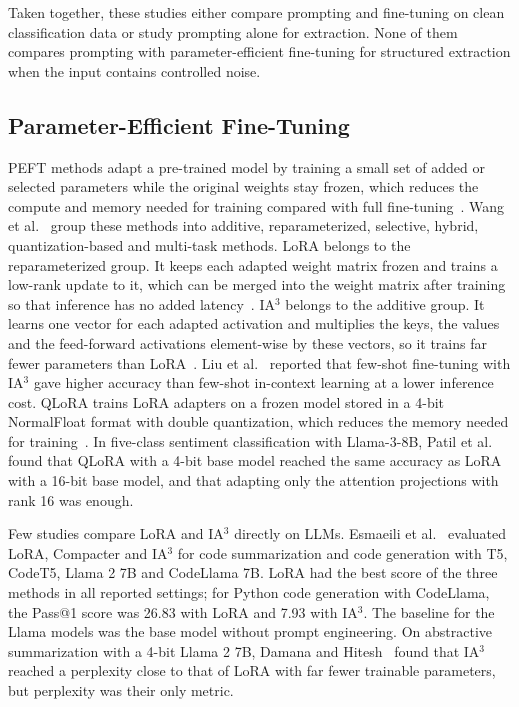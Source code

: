 \documentclass[journal,article,submit,pdftex,moreauthors]{Definitions/mdpi}
\begin{document}
Taken together, these studies either compare prompting and fine-tuning on clean classification data or study prompting alone for extraction. None of them compares prompting with parameter-efficient fine-tuning for structured extraction when the input contains controlled noise.

\subsection{Parameter-Efficient Fine-Tuning}\label{sec:rw-peft}

PEFT methods adapt a pre-trained model by training a small set of added or selected parameters while the original weights stay frozen, which reduces the compute and memory needed for training compared with full fine-tuning~\citep{wang2025parameter}. Wang et al.~\citep{wang2025parameter} group these methods into additive, reparameterized, selective, hybrid, quantization-based and multi-task methods. LoRA belongs to the reparameterized group. It keeps each adapted weight matrix frozen and trains a low-rank update to it, which can be merged into the weight matrix after training so that inference has no added latency~\citep{hu2022lora}. IA$^3$ belongs to the additive group. It learns one vector for each adapted activation and multiplies the keys, the values and the feed-forward activations element-wise by these vectors, so it trains far fewer parameters than LoRA~\citep{liu2022fewshot}. Liu et al.~\citep{liu2022fewshot} reported that few-shot fine-tuning with IA$^3$ gave higher accuracy than few-shot in-context learning at a lower inference cost. QLoRA trains LoRA adapters on a frozen model stored in a 4-bit NormalFloat format with double quantization, which reduces the memory needed for training~\citep{dettmers2023qlora}. In five-class sentiment classification with Llama-3-8B, Patil et al.~\citep{patil2025analyzing} found that QLoRA with a 4-bit base model reached the same accuracy as LoRA with a 16-bit base model, and that adapting only the attention projections with rank 16 was enough.

Few studies compare LoRA and IA$^3$ directly on LLMs. Esmaeili et al.~\citep{esmaeili2026empirical} evaluated LoRA, Compacter and IA$^3$ for code summarization and code generation with T5, CodeT5, Llama 2 7B and CodeLlama 7B. LoRA had the best score of the three methods in all reported settings; for Python code generation with CodeLlama, the Pass@1 score was 26.83 with LoRA and 7.93 with IA$^3$. The baseline for the Llama models was the base model without prompt engineering. On abstractive summarization with a 4-bit Llama 2 7B, Damana and Hitesh~\citep{damana2024innovative} found that IA$^3$ reached a perplexity close to that of LoRA with far fewer trainable parameters, but perplexity was their only metric.
\end{document}
